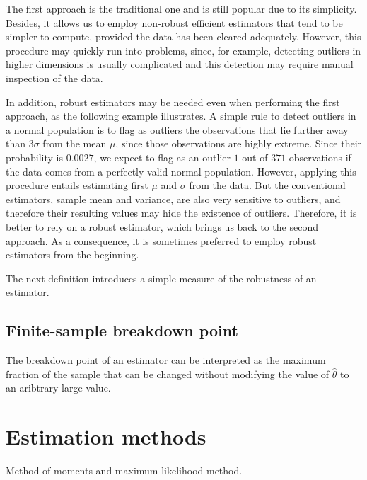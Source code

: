 The first approach is the traditional one and is still popular due to its
simplicity. Besides, it allows us to employ non-robust efficient estimators that
tend to be simpler to compute, provided the data has been cleared adequately.
However, this procedure may quickly run into problems, since, for example,
detecting outliers in higher dimensions is usually complicated and this
detection may require manual inspection of the data.

In addition, robust estimators may be needed even when performing the first
approach, as the following example illustrates. A simple rule to detect outliers
in a normal population is to flag as outliers the observations that lie further
away than $3\sigma$ from the mean $\mu$, since those observations are highly
extreme. Since their probability is $0.0027$, we expect to flag as an outlier
$1$ out of $371$ observations if the data comes from a perfectly valid normal
population. However, applying this procedure entails estimating first $\mu$ and
$\sigma$ from the data. But the conventional estimators, sample mean and
variance, are also very sensitive to outliers, and therefore their resulting
values may hide the existence of outliers. Therefore, it is better to rely on a
robust estimator, which brings us back to the second approach. As a consequence,
it is sometimes preferred to employ robust estimators from the beginning.

The next definition introduces a simple measure of the robustness of an
estimator.

\subsection{Finite-sample breakdown point}
The breakdown point of an estimator can be interpreted as the maximum fraction
of the sample that can be changed without modifying the value of $\hat{\theta}$
to an aribtrary large value.


\section{Estimation methods}
Method of moments and maximum likelihood method.